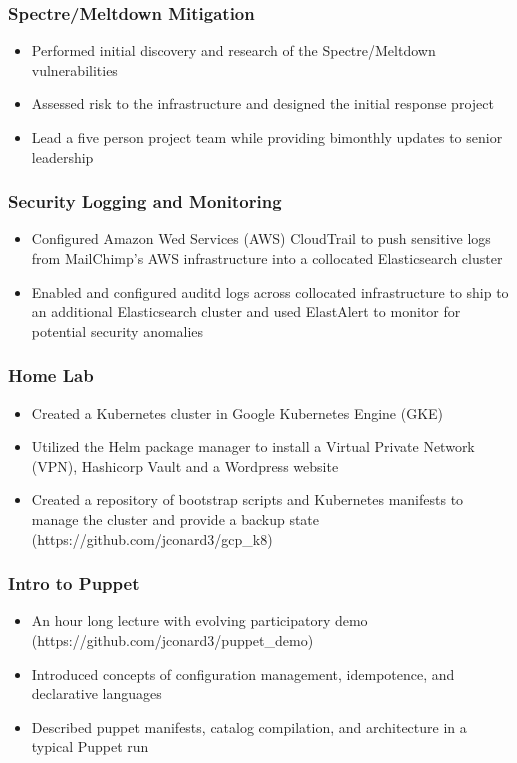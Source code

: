 \documentclass[letterpaper]{article}
\begin{document}
\subsubsection*{Spectre/Meltdown Mitigation}
\begin{itemize}[noitemsep]
	\item Performed initial discovery and research of the Spectre/Meltdown vulnerabilities
	\item Assessed risk to the infrastructure and designed the initial response project
	\item Lead a five person project team while providing bimonthly updates to senior leadership
\end{itemize}
\subsubsection*{Security Logging and Monitoring}
\begin{itemize}[noitemsep]
	\item Configured Amazon Wed Services (AWS) CloudTrail to push sensitive logs from MailChimp's AWS infrastructure into a collocated Elasticsearch cluster
	\item Enabled and configured auditd logs across collocated infrastructure to ship to an additional Elasticsearch cluster and used ElastAlert to monitor for potential security anomalies
\end{itemize}
\subsubsection*{Home Lab}
\begin{itemize}[noitemsep]
	\item Created a Kubernetes cluster in Google Kubernetes Engine (GKE)
	\item Utilized the Helm package manager to install a Virtual Private Network (VPN), Hashicorp Vault and a Wordpress website
	\item Created a repository of bootstrap scripts and Kubernetes manifests to manage the cluster and provide a backup state (https://github.com/jconard3/gcp\_k8)
\end{itemize}
\subsubsection*{Intro to Puppet}
\begin{itemize}[noitemsep]
	\item An hour long lecture with evolving participatory demo (https://github.com/jconard3/puppet\_demo)
	\item Introduced concepts of configuration management, idempotence, and declarative languages
	\item Described puppet manifests, catalog compilation, and architecture in a typical Puppet run
\end{itemize}
\end{document}
